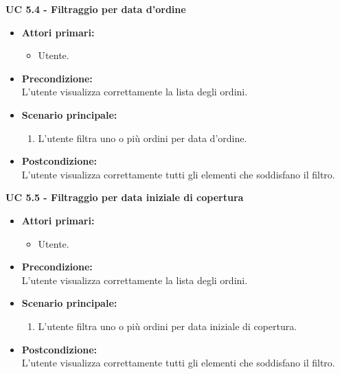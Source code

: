 \vspace{0.5cm}

\noindent \textbf{\large UC 5.4 - Filtraggio per data d'ordine}
\label{uc:filtraggio-data-ordine}
\begin{itemize}

	\item \textbf{Attori primari: }
		\begin{itemize}
			\item Utente.
		\end{itemize}

	\item \textbf{Precondizione: }\\[0.3cm]
		L'utente visualizza correttamente la lista degli ordini.

	\item \textbf{Scenario principale: }
		\begin{enumerate}
			\item L'utente filtra uno o più ordini per data d'ordine.
		\end{enumerate}
		

	\item \textbf{Postcondizione: }\\[0.3cm]
		L'utente visualizza correttamente tutti gli elementi che soddisfano il filtro.

\end{itemize}

\vspace{0.5cm}

\noindent \textbf{\large UC 5.5 - Filtraggio per data iniziale di copertura}
\label{uc:filtraggio-data-iniziale-copertura}
\begin{itemize}

	\item \textbf{Attori primari: }
		\begin{itemize}
			\item Utente.
		\end{itemize}

	\item \textbf{Precondizione: }\\[0.3cm]
		L'utente visualizza correttamente la lista degli ordini.

	\item \textbf{Scenario principale: }
		\begin{enumerate}
			\item L'utente filtra uno o più ordini per data iniziale di copertura.
		\end{enumerate}
		

	\item \textbf{Postcondizione: }\\[0.3cm]
		L'utente visualizza correttamente tutti gli elementi che soddisfano il filtro.

\end{itemize}


